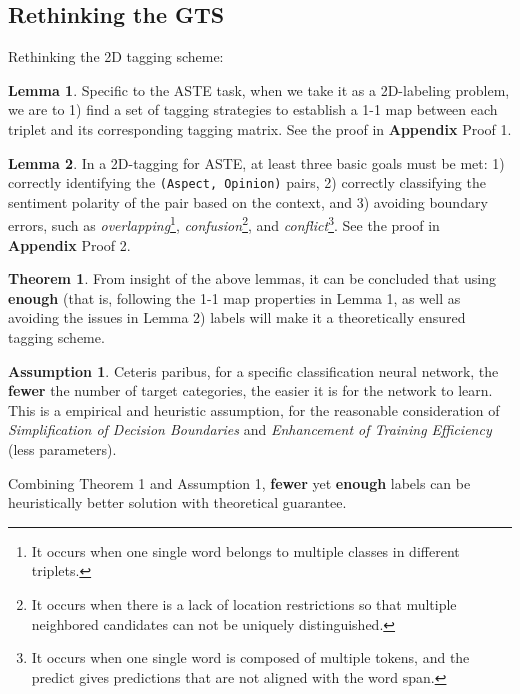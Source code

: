 \documentclass[11pt]{article}
\begin{document}
\subsection{Rethinking the GTS}
\label{Rethinking the GTS}
Rethinking the 2D tagging scheme:

\noindent \textbf{Lemma 1}. Specific to the ASTE task, when we take it as a 2D-labeling problem, we are to 1) find a set of tagging strategies to establish a 1-1 map between each triplet and its corresponding tagging matrix. See the proof in \textbf{Appendix} Proof 1. 
\label{lemma1}

\noindent \textbf{Lemma 2}. In a 2D-tagging for ASTE, at least three basic goals must be met: 
1) correctly identifying the \texttt{(Aspect, Opinion)} pairs, 
2) correctly classifying the sentiment polarity of the pair based on the context, and 
3) avoiding boundary errors, such as \textit{overlapping}\footnote{It occurs when one single word belongs to multiple classes in different triplets. }, \textit{confusion}\footnote{It occurs when there is a lack of location restrictions so that multiple neighbored candidates can not be uniquely distinguished. }, 
and \textit{conflict}\footnote{It occurs when one single word is composed of multiple tokens, and the predict gives predictions that are not aligned with the word span. }. See the proof in \textbf{Appendix} Proof 2.


\noindent \textbf{Theorem 1}. From insight of the above lemmas, it can be concluded that using \textbf{enough} (that is, following the 1-1 map properties in Lemma 1, as well as avoiding the issues in Lemma 2) labels will make it a theoretically ensured tagging scheme.

\noindent \textbf{Assumption 1}. Ceteris paribus, for a specific classification neural network, the \textbf{fewer} the number of target categories, the easier it is for the network to learn. This is a empirical and heuristic assumption, for the reasonable consideration of \textit{Simplification of Decision Boundaries} \cite{Hinton2006} and \textit{Enhancement of Training Efficiency} (less parameters). 

Combining Theorem 1 and Assumption 1, \textbf{fewer} yet \textbf{enough} labels can be heuristically better solution with theoretical guarantee.   
\end{document}
